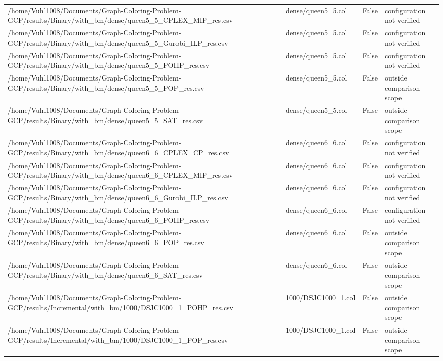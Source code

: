 \begin{table}[htbp]
\begin{tabular}{llll}
/home/Vuhl1008/Documents/Graph-Coloring-Problem-GCP/results/Binary/with\_bm/dense/queen5\_5\_CPLEX\_MIP\_res.csv & dense/queen5\_5.col & False & configuration not verified \\
/home/Vuhl1008/Documents/Graph-Coloring-Problem-GCP/results/Binary/with\_bm/dense/queen5\_5\_Gurobi\_ILP\_res.csv & dense/queen5\_5.col & False & configuration not verified \\
/home/Vuhl1008/Documents/Graph-Coloring-Problem-GCP/results/Binary/with\_bm/dense/queen5\_5\_POHP\_res.csv & dense/queen5\_5.col & False & configuration not verified \\
/home/Vuhl1008/Documents/Graph-Coloring-Problem-GCP/results/Binary/with\_bm/dense/queen5\_5\_POP\_res.csv & dense/queen5\_5.col & False & outside comparison scope \\
/home/Vuhl1008/Documents/Graph-Coloring-Problem-GCP/results/Binary/with\_bm/dense/queen5\_5\_SAT\_res.csv & dense/queen5\_5.col & False & outside comparison scope \\
/home/Vuhl1008/Documents/Graph-Coloring-Problem-GCP/results/Binary/with\_bm/dense/queen6\_6\_CPLEX\_CP\_res.csv & dense/queen6\_6.col & False & configuration not verified \\
/home/Vuhl1008/Documents/Graph-Coloring-Problem-GCP/results/Binary/with\_bm/dense/queen6\_6\_CPLEX\_MIP\_res.csv & dense/queen6\_6.col & False & configuration not verified \\
/home/Vuhl1008/Documents/Graph-Coloring-Problem-GCP/results/Binary/with\_bm/dense/queen6\_6\_Gurobi\_ILP\_res.csv & dense/queen6\_6.col & False & configuration not verified \\
/home/Vuhl1008/Documents/Graph-Coloring-Problem-GCP/results/Binary/with\_bm/dense/queen6\_6\_POHP\_res.csv & dense/queen6\_6.col & False & configuration not verified \\
/home/Vuhl1008/Documents/Graph-Coloring-Problem-GCP/results/Binary/with\_bm/dense/queen6\_6\_POP\_res.csv & dense/queen6\_6.col & False & outside comparison scope \\
/home/Vuhl1008/Documents/Graph-Coloring-Problem-GCP/results/Binary/with\_bm/dense/queen6\_6\_SAT\_res.csv & dense/queen6\_6.col & False & outside comparison scope \\
/home/Vuhl1008/Documents/Graph-Coloring-Problem-GCP/results/Incremental/with\_bm/1000/DSJC1000\_1\_POHP\_res.csv & 1000/DSJC1000\_1.col & False & outside comparison scope \\
/home/Vuhl1008/Documents/Graph-Coloring-Problem-GCP/results/Incremental/with\_bm/1000/DSJC1000\_1\_POP\_res.csv & 1000/DSJC1000\_1.col & False & outside comparison scope \\

\end{tabular}
\end{table}
